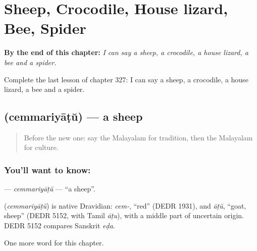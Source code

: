 
\chapter{Sheep, Crocodile, House lizard, Bee, Spider}
\label{ch:ml-sheep-crocodile-house-lizard-bee-spider}

\begin{chapteropening}
\textbf{By the end of this chapter:} \emph{I can say a sheep, a crocodile, a house lizard, a bee and a spider.}

Complete the last lesson of chapter 327: I can say a sheep, a crocodile, a house lizard, a bee and a spider.
\end{chapteropening}

\section[\texorpdfstring{\ml{ചെമ്മരിയാട്} (cemmariyāṭŭ)}{ചെമ്മരിയാട് (cemmariyāṭŭ)}]{ (cemmariyāṭŭ) — a sheep}

\label{lesson:ML-C327-cemmariyatu}



\begin{quote}
Before the new one: say the Malayalam for tradition, then the Malayalam for culture.
\end{quote}

\subsection*{You'll want to know: }
\textbf{} — \emph{cemmariyāṭŭ} — \textquotedblleft{}a sheep\textquotedblright{}.

\begin{cousinweb}
\textbf{} (\emph{cemmariyāṭŭ}) is native Dravidian: \emph{cem-}, \textquotedblleft{}red\textquotedblright{} (DEDR 1931), and \emph{āṭŭ}, \textquotedblleft{}goat, sheep\textquotedblright{} (DEDR 5152, with Tamil \emph{āṭu}), with a middle part of uncertain origin. DEDR 5152 compares Sanskrit \emph{eḍa}.
\end{cousinweb}

\begin{grammarlens}[title={What you've built}]
One more word for this chapter.
\end{grammarlens}

